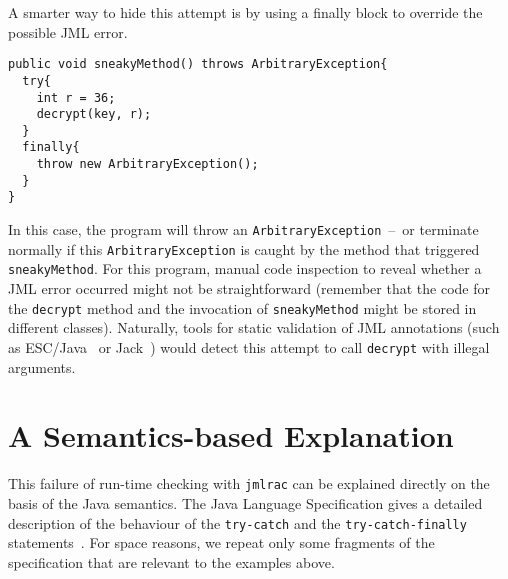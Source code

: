 \documentclass[]{llncs}
\begin{document}
A smarter way to hide this attempt is by using a finally block to
override the possible JML error.
\begin{verbatim}
public void sneakyMethod() throws ArbitraryException{
  try{ 
    int r = 36; 
    decrypt(key, r);                                           
  }           
  finally{
    throw new ArbitraryException();
  }
}
\end{verbatim}
In this case, the program will throw an
\texttt{ArbitraryException}~--~or terminate normally if this
\texttt{ArbitraryException} is caught by the method that triggered
\texttt{sneakyMethod}. For this program, manual code inspection to
reveal whether a JML error occurred might not be straightforward
(remember that the code for the \texttt{decrypt} method and the
invocation of \texttt{sneakyMethod} might be stored in different
classes). Naturally, tools for static validation of JML annotations
(such as ESC/Java~\cite{CokK04} or Jack~\cite{BartheBCGHLPR07:FMCO})
would detect this attempt to call \texttt{decrypt} with illegal
arguments.

\section{A Semantics-based Explanation}\label{SecExplanation}

This failure of run-time checking with \texttt{jmlrac} can be
explained directly on the basis of the Java semantics. The Java
Language Specification gives a detailed description of the behaviour
of the
\texttt{try-catch} and the 
\texttt{try-catch-finally} statements~\cite[\S
14.20]{GoslingJSB05}. For space reasons, we repeat only some fragments of
the specification that are relevant to the examples above.
\end{document}
